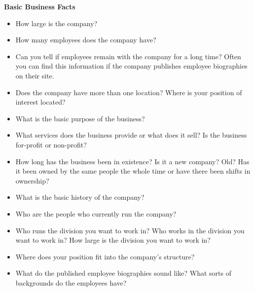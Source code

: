 \textbf{Basic Business Facts}
\begin{itemize}[leftmargin=*]
\item How large is the company?
\item How many employees does the company have?
\item Can you tell if employees remain with the company for a long time? Often you can find this information if the company publishes employee biographies on their site.
\item Does the company have more than one location? Where is your position of interest located?
\item What is the basic purpose of the business?
\item What services does the business provide or what does it sell? Is the business for-profit or non-profit?
\item How long has the business been in existence? Is it a new company? Old? Has it been owned by the same people the whole time or have there been shifts in ownership?
\item What is the basic history of the company?
\item Who are the people who currently run the company?
 \item Who runs the division you want to work in? Who works in the division you want to work in? How large is the division you want to work in?
\item Where does your position fit into the company's structure?
\item What do the published employee biographies sound like? What sorts of backgrounds do the employees have?
\end{itemize}


